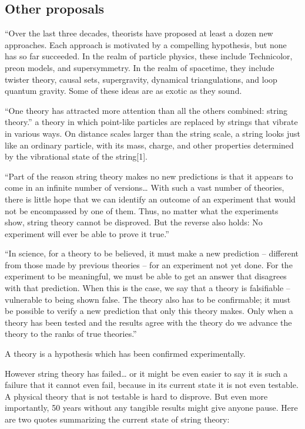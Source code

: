 \documentclass {article}
\begin{document}
\subsection{Other proposals}
	

“Over the last three decades, theorists have proposed at least a dozen new approaches. Each approach is motivated by a compelling hypothesis, but none has so far succeeded. In the realm of particle physics, these include Technicolor, preon models, and supersymmetry. In the realm of spacetime, they include twister theory, causal sets, supergravity, dynamical triangulations, and loop quantum gravity. Some of these ideas are as exotic as they sound.
	
	“One theory has attracted more attention than all the others combined: string theory.”  a theory in which point-like particles are replaced by strings that vibrate in various ways. On distance scales larger than the string scale, a string looks just like an ordinary particle, with its mass, charge, and other properties determined by the vibrational state of the string[1]. 
	
	“Part of the reason string theory makes no new predictions is that it appears to come in an infinite number of versions… With such a vast number of theories, there is little hope that we can identify an outcome of an experiment that would not be encompassed by one of them. Thus, no matter what the experiments show, string theory cannot be disproved. But the reverse also holds: No experiment will ever be able to prove it true.” 
	
	“In science, for a theory to be believed, it must make a new prediction -- different from those made by previous theories -- for an experiment not yet done. For the experiment to be meaningful, we must be able to get an answer that disagrees with that prediction. When this is the case, we say that a theory is falsifiable -- vulnerable to being shown false. The theory also has to be confirmable; it must be possible to verify a new prediction that only this theory makes. Only when a theory has been tested and the results agree with the theory do we advance the theory to the ranks of true theories.”
	
	A theory is a hypothesis which has been confirmed experimentally.
	
	However string theory has failed… or it might be even easier to say it is such a failure that it cannot even fail, because in its current state it is not even testable. A physical theory that is not testable is hard to disprove. But even more importantly, 50 years without any tangible results might give anyone pause. Here are two quotes summarizing the current state of string theory:
	
\end{document}
